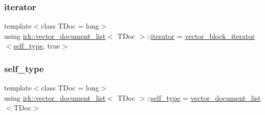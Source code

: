 \mbox{\label{classirk_1_1vector__document__list_a42499af78a7d66a1b626858cd424600f}} 
\subsubsection{\texorpdfstring{iterator}{iterator}}
{\footnotesize\ttfamily template$<$class T\+Doc  = long$>$ \\
using \mbox{\hyperlink{classirk_1_1vector__document__list}{irk\+::vector\+\_\+document\+\_\+list}}$<$ T\+Doc $>$\+::\mbox{\hyperlink{classirk_1_1vector__document__list_a42499af78a7d66a1b626858cd424600f}{iterator}} =  \mbox{\hyperlink{classirk_1_1vector__block__iterator}{vector\+\_\+block\+\_\+iterator}}$<$\mbox{\hyperlink{classirk_1_1vector__document__list_a8c83c7819e9ffcbb4162d3ee9f41d76a}{self\+\_\+type}}, true$>$}

\mbox{\label{classirk_1_1vector__document__list_a8c83c7819e9ffcbb4162d3ee9f41d76a}} 
\subsubsection{\texorpdfstring{self\+\_\+type}{self\_type}}
{\footnotesize\ttfamily template$<$class T\+Doc  = long$>$ \\
using \mbox{\hyperlink{classirk_1_1vector__document__list}{irk\+::vector\+\_\+document\+\_\+list}}$<$ T\+Doc $>$\+::\mbox{\hyperlink{classirk_1_1vector__document__list_a8c83c7819e9ffcbb4162d3ee9f41d76a}{self\+\_\+type}} =  \mbox{\hyperlink{classirk_1_1vector__document__list}{vector\+\_\+document\+\_\+list}}$<$T\+Doc$>$}

\mbox{\label{classirk_1_1vector__document__list_ac9387bd9f5dc89b638b6295858a9268c}} 
